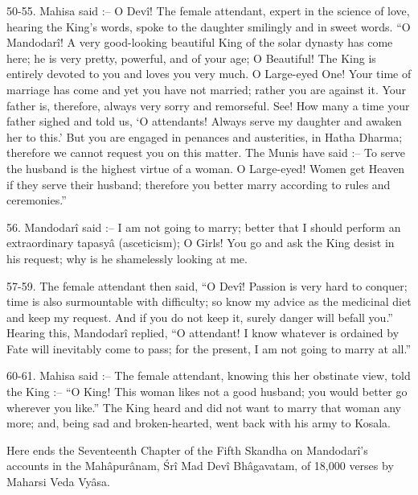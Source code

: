 50-55. Mahisa said :-- O Dev\^i! The female attendant, expert in the science of love, hearing the King's words, spoke to the daughter smilingly and in sweet words. ``O Mandodar\^i! A very good-looking beautiful King of the solar dynasty has come here; he is very pretty, powerful, and of your age; O Beautiful! The King is entirely devoted to you and loves you very much. O Large-eyed One! Your time of marriage has come and yet you have not married; rather you are against it. Your father is, therefore, always very sorry and remorseful. See! How many a time your father sighed and told us, ‘O attendants! Always serve my daughter and awaken her to this.' But you are engaged in penances and austerities, in Hatha Dharma; therefore we cannot request you on this matter. The Munis have said :-- To serve the husband is the highest virtue of a woman. O Large-eyed! Women get Heaven if they serve their husband; therefore you better marry according to rules and ceremonies.''

56. Mandodar\^i said :-- I am not going to marry; better that I should perform an extraordinary tapasy\^a (asceticism); O Girls! You go and ask the King desist in his request; why is he shamelessly looking at me.

57-59. The female attendant then said, ``O Dev\^i! Passion is very hard to conquer; time is also surmountable with difficulty; so know my advice as the medicinal diet and keep my request. And if you do not keep it, surely danger will befall you.'' Hearing this, Mandodar\^i replied, ``O attendant! I know whatever is ordained by Fate will inevitably come to pass; for the present, I am not going to marry at all.''

60-61. Mahisa said :-- The female attendant, knowing this her obstinate view, told the King :-- ``O King! This woman likes not a good husband; you would better go wherever you like.'' The King heard and did not want to marry that woman any more; and, being sad and broken-hearted, went back with his army to Kosala.

Here ends the Seventeenth Chapter of the Fifth Skandha on Mandodar\^i's accounts in the Mah\^apur\^anam, \'Sr\^i Mad Dev\^i Bh\^agavatam, of 18,000 verses by Maharsi Veda Vy\^asa.